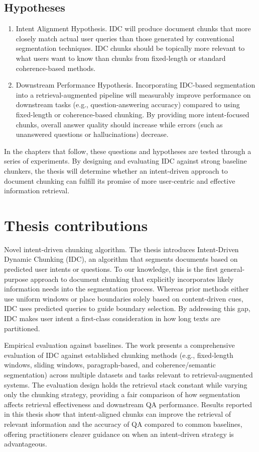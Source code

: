 \documentclass[12pt,a4paper]{report}
\begin{document}
\subsection{Hypotheses}
\begin{enumerate}
\item Intent Alignment Hypothesis. IDC will produce document chunks that more closely match actual user queries than those generated by conventional segmentation techniques. IDC chunks should be topically more relevant to what users want to know than chunks from fixed-length or standard coherence-based methods.

\item Downstream Performance Hypothesis. Incorporating IDC-based segmentation into a retrieval-augmented pipeline will measurably improve performance on downstream tasks (e.g., question-answering accuracy) compared to using fixed-length or coherence-based chunking. By providing more intent-focused chunks, overall answer quality should increase while errors (such as unanswered questions or hallucinations) decrease.
\end{enumerate}

In the chapters that follow, these questions and hypotheses are tested through a series of experiments. By designing and evaluating IDC against strong baseline chunkers, the thesis will determine whether an intent-driven approach to document chunking can fulfill its promise of more user-centric and effective information retrieval.

\section{Thesis contributions}

Novel intent-driven chunking algorithm. The thesis introduces Intent-Driven Dynamic Chunking (IDC), an algorithm that segments documents based on predicted user intents or questions. To our knowledge, this is the first general-purpose approach to document chunking that explicitly incorporates likely information needs into the segmentation process. Whereas prior methods either use uniform windows or place boundaries solely based on content-driven cues, IDC uses predicted queries to guide boundary selection. By addressing this gap, IDC makes user intent a first-class consideration in how long texts are partitioned.

Empirical evaluation against baselines. The work presents a comprehensive evaluation of IDC against established chunking methods (e.g., fixed-length windows, sliding windows, paragraph-based, and coherence/semantic segmentation) across multiple datasets and tasks relevant to retrieval-augmented systems. The evaluation design holds the retrieval stack constant while varying only the chunking strategy, providing a fair comparison of how segmentation affects retrieval effectiveness and downstream QA performance. Results reported in this thesis show that intent-aligned chunks can improve the retrieval of relevant information and the accuracy of QA compared to common baselines, offering practitioners clearer guidance on when an intent-driven strategy is advantageous.
\end{document}
